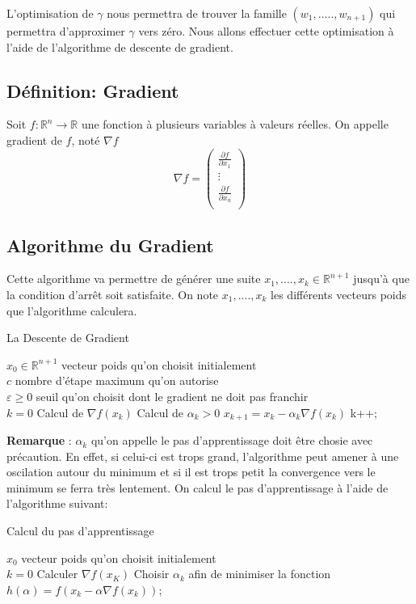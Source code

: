 \documentclass{article}
\begin{document}
L'optimisation de $\gamma$ nous permettra de trouver la famille $(w_1,.....,w_{n+1})$ qui permettra d'approximer $\gamma$ vers zéro. Nous allons effectuer cette optimisation à l'aide de l'algorithme de descente de gradient.

	\subsection{Définition: Gradient}
		Soit $f: \mathbb{R}^{n} \to \mathbb{R}$ une fonction à plusieurs variables à valeurs réelles. On appelle gradient de $f$, noté $\nabla f$
		\[ \nabla f= \begin{pmatrix} 
					\frac{\partial f}{\partial x_1} \\
					\vdots\\	
					\frac{\partial f}{\partial x_n}\\
				 \end{pmatrix} \] 

\subsection{Algorithme du Gradient}
 	
	Cette algorithme va permettre de générer une suite  $x_{1},....,x_{k} \in \mathbb{R}^{n+1}$ jusqu'à que la condition d'arrêt soit satisfaite. On note $x_{1},....,x_{k}$ les différents vecteurs poids que l'algorithme calculera.
\newpage
	\begin{algorithm}
	\caption{La Descente de Gradient}
	\begin{algorithmic}
	\REQUIRE $x_{0} \in \mathbb{R}^{n+1}$ vecteur poids qu'on choisit initialement \\ 
	$c$ nombre d'étape maximum qu'on autorise  \\ %
	$\varepsilon \ge 0$ seuil qu'on choisit dont le gradient ne doit pas franchir \\ 
	$k=0$
		\STATE Calcul de $\nabla f(x_{k})$ \; %
		\STATE Calcul de $\alpha_{k} > 0 $ \;
		\STATE $ x_{k+1} = x_{k} - \alpha_{k} \nabla f(x_{k}) $ \;
		\STATE k++; 
	\ENDWHILE
	\end{algorithmic}
	\end{algorithm} 
\textbf{Remarque }: $\alpha_{k}$ qu'on appelle le pas d'apprentissage doit être chosie avec précaution. En effet, si celui-ci est trops grand, l'algorithme peut amener à une oscilation autour du minimum et si il est trops petit la convergence vers le minimum se ferra très lentement. 
On calcul le pas d'apprentissage à l'aide de l'algorithme suivant: 
	\begin{algorithm}
	\caption{Calcul du pas d'apprentissage}
	\begin{algorithmic}
	\REQUIRE $x_{0}$ vecteur poids qu'on choisit initialement \\ 
	$k=0$
	\STATE Calculer $\nabla f(x_{K})$ \; 
	\STATE Choisir $\alpha_{k}$ afin de minimiser la fonction $h(\alpha) = f(x_{k}-\alpha \nabla f(x_{k}))$;
	\end{algorithmic}
	\end{algorithm} 
\end{document}
